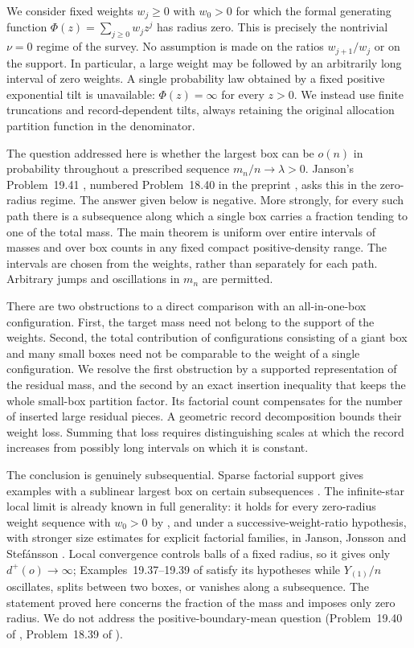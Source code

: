 \documentclass[11pt]{amsart}
\theoremstyle{remark}\newtheorem{remark}[theorem]{Remark}
\begin{document}
We consider fixed weights $w_j\ge0$ with $w_0>0$ for which the formal
generating function $\Phi(z)=\sum_{j\ge0}w_jz^j$ has radius zero. This is
precisely the nontrivial $\nu=0$ regime of the survey. No assumption is made
on the ratios $w_{j+1}/w_j$ or on the support. In particular, a large weight
may be followed by an arbitrarily long interval of zero weights. A single
probability law obtained by a fixed positive exponential tilt is unavailable:
$\Phi(z)=\infty$ for every $z>0$. We instead use finite truncations and
record-dependent tilts, always retaining the original allocation
partition function in the denominator.

The question addressed here is whether the largest box can be $o(n)$ in
probability throughout a prescribed sequence $m_n/n\to\lambda>0$.
Janson's Problem~19.41 \cite[p.~228]{Janson}, numbered Problem~18.40
in the preprint \cite{JansonPreprint}, asks this in the zero-radius regime.
The answer given below is negative. More strongly, for every such path
there is a subsequence along which a single box carries a fraction tending
to one of the total mass. The main theorem is uniform over entire intervals
of masses and over box counts in any fixed compact positive-density range.
The intervals are chosen from the weights, rather than separately for each
path. Arbitrary jumps and oscillations in $m_n$ are permitted.

There are two obstructions to a direct comparison with an all-in-one-box
configuration. First, the target mass need not belong to the support of the
weights. Second, the total contribution of configurations consisting of a
giant box and many small boxes need not be comparable to the weight of a
single configuration. We resolve the first obstruction by a supported
representation of the residual mass, and the second by an exact insertion
inequality that keeps the whole small-box partition factor. Its factorial
count compensates for the number of inserted large residual pieces.
A geometric record decomposition bounds their weight loss. Summing that
loss requires distinguishing scales at which the record increases from
possibly long intervals on which it is constant.

The conclusion is genuinely subsequential. Sparse factorial support gives
examples with a sublinear largest box on certain subsequences
\cite[Example~19.39]{Janson}. The infinite-star local limit is already known
in full generality: it holds for every zero-radius weight sequence with
$w_0>0$ by \cite[Theorem~7.1]{Janson}, and under a successive-weight-ratio
hypothesis, with stronger size estimates for explicit factorial families, in
Janson, Jonsson and Stef\'ansson \cite{JJS}. Local convergence controls balls
of a fixed radius, so it gives only $d^+(o)\to\infty$; Examples~19.37--19.39
of \cite{Janson} satisfy its hypotheses while $Y_{(1)}/n$ oscillates, splits
between two boxes, or vanishes along a subsequence. The statement proved here
concerns the fraction of the mass and imposes only zero radius. We do not address the positive-boundary-mean question
(Problem~19.40 of \cite{Janson}, Problem~18.39 of \cite{JansonPreprint}).
\end{document}
